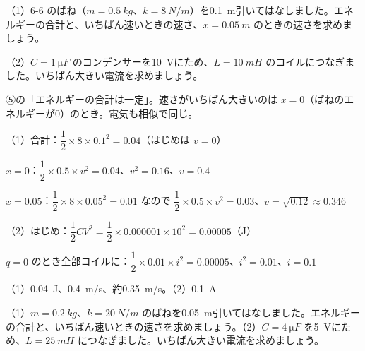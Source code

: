 \begin{reidai}
（1）6-6 のばね（$m=\qty{0.5}{kg}$、$k=\qty{8}{N/m}$）を\qty{0.1}{m}引いてはなしました。エネルギーの合計と、いちばん速いときの速さ、$x=\qty{0.05}{m}$ のときの速さを求めましょう。\par
（2）$C=\qty{1}{\micro F}$ のコンデンサーを\qty{10}{V}にため、$L=\qty{10}{mH}$ のコイルにつなぎました。いちばん大きい電流を求めましょう。\par
\kangaekata ⑤の「エネルギーの合計は一定」。速さがいちばん大きいのは $x=0$（ばねのエネルギーが0）のとき。電気も相似で同じ。\par
\shiki\kvips{}\zw{} （1）合計：$\dfrac12\times8\times0.1^2=0.04$（はじめは $v=0$）\par
\kvipa \hspace*{1.7\zw}$x=0$：$\dfrac12\times0.5\times v^2=0.04$、$v^2=0.16$、$v=0.4$\par
\kvipa \hspace*{1.7\zw}$x=0.05$：$\dfrac12\times8\times0.05^2=0.01$ なので $\dfrac12\times0.5\times v^2=0.03$、$v=\sqrt{0.12}\approx0.346$\par
\kvipa （2）はじめ：$\dfrac12CV^2=\dfrac12\times0.000001\times10^2=0.00005$（J）\par
\kvipa \hspace*{1.7\zw}$q=0$ のとき全部コイルに：$\dfrac12\times0.01\times i^2=0.00005$、$i^2=0.01$、$i=0.1$\par
\kotae\kvips{}\zw{} （1）\qty{0.04}{J}、\qty{0.4}{m/s}、約\qty{0.35}{m/s}。（2）\qty{0.1}{A}
\end{reidai}

\begin{jibun}
（1）$m=\qty{0.2}{kg}$、$k=\qty{20}{N/m}$ のばねを\qty{0.05}{m}引いてはなしました。エネルギーの合計と、いちばん速いときの速さを求めましょう。\newline （2）$C=\qty{4}{\micro F}$ を\qty{5}{V}にため、$L=\qty{25}{mH}$ につなぎました。いちばん大きい電流を求めましょう。
\end{jibun}


